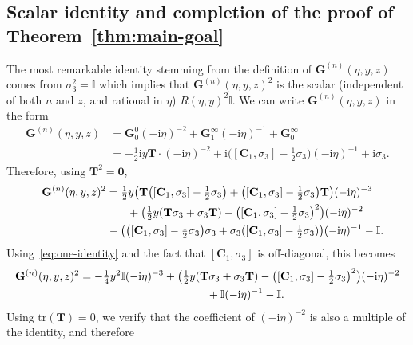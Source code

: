 \subsection{Scalar identity and completion of the proof of Theorem~\ref{thm:main-goal}}
The most remarkable identity stemming from the definition of $\mathbf{G}^{(n)}(\eta,y,z)$ comes from $\sigma_3^2=\mathbb{I}$ which implies that $\mathbf{G}^{(n)}(\eta,y,z)^2$ is the scalar (independent of both $n$ and $z$, and rational in $\eta$) $R(\eta,y)^2\mathbb{I}$. We can write $\mathbf{G}^{(n)}(\eta,y,z)$ in the form
\begin{align*}
\mathbf{G}^{(n)}(\eta,y,z)& =\mathbf{G}_0^0(-\mathrm{i}\eta)^{-2} + \mathbf{G}_1^\infty(-\mathrm{i}\eta)^{-1} +\mathbf{G}_0^\infty \\
& = -\tfrac{1}{2}\mathrm{i} y\mathbf{T}\cdot(-\mathrm{i}\eta)^{-2} +
\mathrm{i} \bigl([\mathbf{C}_1,\sigma_3]-\tfrac{1}{2}\sigma_3\bigr)(-\mathrm{i}\eta)^{-1} +\mathrm{i}\sigma_3.
\end{align*}
Therefore, using $\mathbf{T}^2=\mathbf{0}$,
\begin{gather*}
\mathbf{G}^{(n)}(\eta,y,z)^2 = \tfrac{1}{2}y\bigl(\mathbf{T}\bigl([\mathbf{C}_1,\sigma_3]-\tfrac{1}{2}\sigma_3\bigr)+\bigl([\mathbf{C}_1,\sigma_3]-\tfrac{1}{2}\sigma_3\bigr)\mathbf{T}\bigr)(-\mathrm{i}\eta)^{-3} \\
\hphantom{\mathbf{G}^{(n)}(\eta,y,z)^2 = }{}+ \bigl(\tfrac{1}{2}y(\mathbf{T}\sigma_3 + \sigma_3\mathbf{T})-\bigl([\mathbf{C}_1,\sigma_3]-\tfrac{1}{2}\sigma_3\bigr)^2\bigr)(-\mathrm{i}\eta)^{-2} \\
\hphantom{\mathbf{G}^{(n)}(\eta,y,z)^2 = }{}-\bigl(\bigl([\mathbf{C}_1,\sigma_3]-\tfrac{1}{2}\sigma_3\bigr)\sigma_3 + \sigma_3([\mathbf{C}_1,\sigma_3]-\tfrac{1}{2}\sigma_3)\bigr)(-\mathrm{i}\eta)^{-1} -\mathbb{I}.
\end{gather*}
Using~\eqref{eq:one-identity} and the fact that $[\mathbf{C}_1,\sigma_3]$ is off-diagonal, this becomes
\begin{gather*}
\mathbf{G}^{(n)}(\eta,y,z)^2 = -\tfrac{1}{4}y^2\mathbb{I}(-\mathrm{i}\eta)^{-3} + \bigl(\tfrac{1}{2}y(\mathbf{T}\sigma_3 + \sigma_3\mathbf{T})-\bigl([\mathbf{C}_1,\sigma_3]-\tfrac{1}{2}\sigma_3\bigr)^2\bigr)(-\mathrm{i}\eta)^{-2} \\
\hphantom{\mathbf{G}^{(n)}(\eta,y,z)^2 =}{}+\mathbb{I}(-\mathrm{i}\eta)^{-1}-\mathbb{I}.
\end{gather*}
Using $\mathrm{tr}(\mathbf{T})=0$, we verify that the coefficient of $(-\mathrm{i}\eta)^{-2}$ is also a multiple of the identity, and therefore
